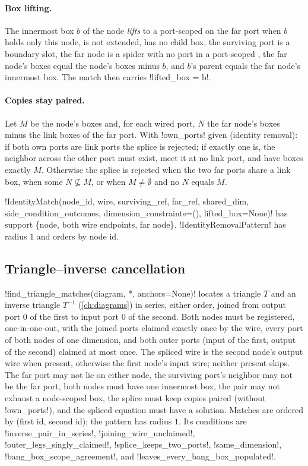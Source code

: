 \paragraph{Box lifting.}
The innermost box $b$ of the node \emph{lifts} to a port-scoped \bbox{} on the far port when $b$
holds only this node, is not extended, has no child box, the surviving port is a boundary slot,
the far node is a spider with no port in a port-scoped \bbox{}, the far node's boxes equal the
node's boxes minus $b$, and $b$'s parent equals the far node's innermost box. The match then
carries \py!lifted_box = b!.

\paragraph{Copies stay paired.}
Let $M$ be the node's boxes and, for each wired port, $N$ the far node's boxes minus the link boxes
of the far port. With \py!own_ports! given (identity removal): if both own ports are link ports
the splice is rejected; if exactly one is, the neighbor across the other port must exist, meet it
at no link port, and have boxes exactly $M$. Otherwise the splice is rejected when the two far
ports share a link box, when some $N \not\subseteq M$, or when $M \neq \emptyset$ and no $N$
equals $M$.

\py!IdentityMatch(node_id, wire, surviving_ref, far_ref, shared_dim, side_condition_outcomes, dimension_constraints=(), lifted_box=None)!
has support \{node, both wire endpoints, far node\}. \py!IdentityRemovalPattern! has radius $1$
and orders by node id.

\subsection{Triangle--inverse cancellation}

\py!find_triangle_matches(diagram, *, anchors=None)! locates a triangle $T$ and an inverse
triangle $T^{-1}$ (\cref{ch:diagrams}) in series, either order, joined from output port $0$ of the
first to input port $0$ of the second. Both nodes must be registered, one-in-one-out, with the
joined ports claimed exactly once by the wire, every port of both nodes of one dimension, and both
outer ports (input of the first, output of the second) claimed at most once. The spliced wire is
the second node's output wire when present, otherwise the first node's input wire; neither
present skips. The far port may not lie on either node, the surviving port's neighbor may not be
the far port, both nodes must have one innermost box, the pair may not exhaust a node-scoped box,
the splice must keep copies paired (without \py!own_ports!), and the spliced equation must have a
solution. Matches are ordered by (first id, second id); the pattern has radius $1$. Its conditions
are \code!inverse_pair_in_series!, \code!joining_wire_unclaimed!, \code!outer_legs_singly_claimed!,
\code!splice_keeps_two_ports!, \code!same_dimension!, \code!bang_box_scope_agreement!, and
\code!leaves_every_bang_box_populated!.

